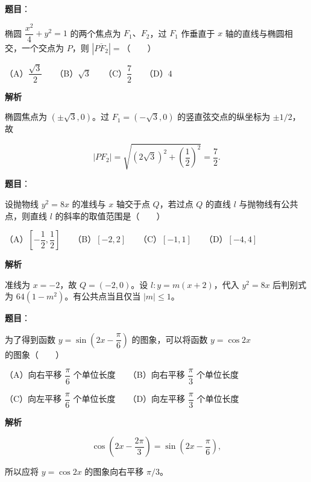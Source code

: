 \begin{answer}

\textbf{题目}：

椭圆 $\dfrac{x^2}{4}+y^2=1$ 的两个焦点为 $F_1\text{、}F_2$，过 $F_1$ 作垂直于 $x$ 轴的直线与椭圆相交，一个交点为 $P$，则 $|\overline{PF_2}|=$\mbox{（　　）}

（A）$\dfrac{\sqrt3}{2}$　　（B）$\sqrt3$　　（C）$\dfrac72$　　（D）$4$

\textbf{解析}

椭圆焦点为 $(\pm\sqrt3,0)$。过 $F_1=(-\sqrt3,0)$ 的竖直弦交点的纵坐标为 $\pm1/2$，故

\nopagebreak[4]
\[
|PF_2|=\sqrt{(2\sqrt3)^2+\left(\frac12\right)^2}=\frac72.
\]


\end{answer}
\begin{answer}

\textbf{题目}：

设抛物线 $y^2=8x$ 的准线与 $x$ 轴交于点 $Q$，若过点 $Q$ 的直线 $l$ 与抛物线有公共点，则直线 $l$ 的斜率的取值范围是\mbox{（　　）}

（A）$\left[-\dfrac12,\dfrac12\right]$　　（B）$[-2,2]$　　（C）$[-1,1]$　　（D）$[-4,4]$

\textbf{解析}

准线为 $x=-2$，故 $Q=(-2,0)$。设 $l:y=m(x+2)$，代入 $y^2=8x$ 后判别式为 $64(1-m^2)$。有公共点当且仅当 $|m|\leqslant1$。


\end{answer}
\begin{answer}

\textbf{题目}：

为了得到函数 $y=\sin\left(2x-\dfrac\pi6\right)$ 的图象，可以将函数 $y=\cos2x$ 的图象\mbox{（　　）}

（A）向右平移 $\dfrac\pi6$ 个单位长度　　（B）向右平移 $\dfrac\pi3$ 个单位长度

（C）向左平移 $\dfrac\pi6$ 个单位长度　　（D）向左平移 $\dfrac\pi3$ 个单位长度

\textbf{解析}

\nopagebreak[4]
\[
\cos\left(2x-\frac{2\pi}{3}\right)
=\sin\left(2x-\frac\pi6\right),
\]

所以应将 $y=\cos2x$ 的图象向右平移 $\pi/3$。


\end{answer}
